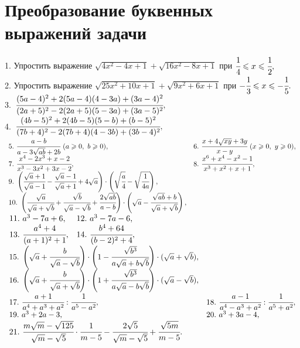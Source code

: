 \section{Преобразование буквенных выражений задачи}
1. Упростить выражение $\sqrt{4x^2-4x+1}+\sqrt{16x^2-8x+1}$ при $\cfrac{1}{4}\leqslant x\leqslant\cfrac{1}{2},$\\
2. Упростить выражение $\sqrt{25x^2+10x+1}+\sqrt{9x^2+6x+1}$ при $-\cfrac{1}{3}\leqslant x\leqslant-\cfrac{1}{5}.$\\
3.\ $\cfrac{(5a-4)^2+2(5a-4)(4-3a)+(3a-4)^2}{(2a+5)^2-2(2a+5)(5-3a)+(3a-5)^2},$\\
4.\ $\cfrac{(4b-5)^2+2(4b-5)(5-b)+(b-5)^2}{(7b+4)^2-2(7b+4)(4-3b)+(3b-4)^2},$\\
$\begin{array}{ll}
5.\ \cfrac{a-b}{a-3\sqrt{ab}+2b}\ (a\geqslant0,\ b\geqslant0),&
6.\ \cfrac{x+4\sqrt{xy}+3y}{x-y}\ (x\geqslant0,\ y\geqslant0),\\
7.\ \cfrac{x^4-2x^3+x-2}{x^3-3x^2+3x-2},&
8.\ \cfrac{x^6+x^4-x^2-1}{x^3+x^2+x+1},\\
9.\ \left(\cfrac{\sqrt{a}+1}{\sqrt{a}-1}-\cfrac{\sqrt{a}-1}{\sqrt{a}+1}+4\sqrt{a}\right)\cdot
\left(\sqrt{\cfrac{a}{4}}-\sqrt{\cfrac{1}{4a}}\right),\\
10.\ \left(\cfrac{\sqrt{a}}{\sqrt{a}+\sqrt{b}}+\cfrac{\sqrt{b}}{\sqrt{a}-\sqrt{b}}+
\cfrac{2\sqrt{ab}}{a-b}\right)\cdot\left(\sqrt{a}-\cfrac{\sqrt{ab}+b}{\sqrt{a}+\sqrt{b}}\right),
\end{array}$\\
$\begin{array}{ll}
11.\ a^3-7a+6,&
12.\ a^3-7a-6,\\
13.\ \cfrac{a^4+4}{(a+1)^2+1},&
14.\ \cfrac{b^4+64}{(b-2)^2+4},\end{array}$\\ $\begin{array}{ll}
15.\ \left(\sqrt{a}+\cfrac{b}{\sqrt{a}-\sqrt{b}}\right)\cdot\left(1-\cfrac{\sqrt{b^3}}{a\sqrt{a}+b\sqrt{b}}\right)\cdot
(\sqrt{a}+\sqrt{b}),\\
16.\ \left(\sqrt{a}+\cfrac{b}{\sqrt{a}+\sqrt{b}}\right)\cdot\left(1+\cfrac{\sqrt{b^3}}{a\sqrt{a}-b\sqrt{b}}\right)\cdot
(\sqrt{a}-\sqrt{b}),\\
17.\ \cfrac{a+1}{a^4+a^3+a^2}: \cfrac{1}{a^5-a^2},&
18.\ \cfrac{a-1}{a^4-a^3+a^2}: \cfrac{1}{a^5+a^2},\\
19.\ a^3+2a-3,&
20.\ a^3+3a-4,
\end{array}$\\
$\begin{array}{ll}
21.\ \cfrac{m\sqrt{m}-\sqrt{125}}{\sqrt{m}-\sqrt{5}}\cdot\cfrac{1}{m-5}-\cfrac{2\sqrt{5}}{\sqrt{m}-\sqrt{5}}+\cfrac{\sqrt{5m}}{m-5}.\\
\end{array}$\\
